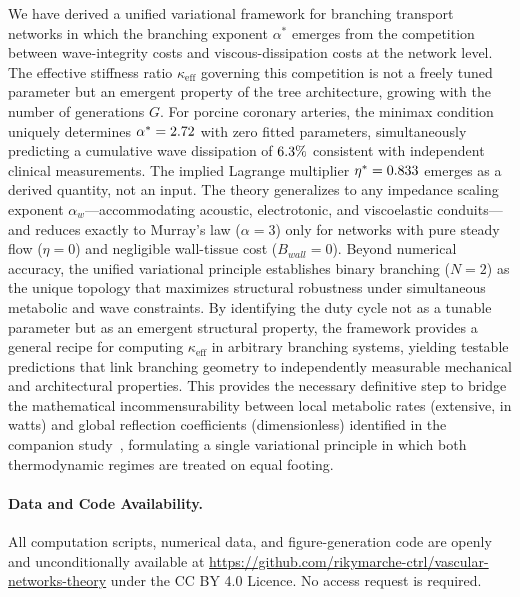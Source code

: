 \documentclass[11pt,a4paper]{article}
\theoremstyle{remark}
\begin{document}
We have derived a unified variational framework for branching transport networks
in which the branching exponent $\alpha^*$ emerges from the competition between
wave-integrity costs and viscous-dissipation costs at the network level.
The effective stiffness ratio $\kappa_\mathrm{eff}$ governing this competition
is not a freely tuned parameter but an emergent property of the tree
architecture, growing with the number of generations $G$.
For porcine coronary arteries, the minimax condition uniquely determines
$\alpha^* = 2.72$ with zero fitted parameters, simultaneously
predicting a cumulative wave dissipation of $6.3\%$ consistent with
independent clinical measurements. The implied Lagrange multiplier $\eta^* =
0.833$ emerges as a derived quantity, not an input.
The theory generalizes to any impedance scaling exponent
$\alpha_w$---accommodating acoustic, electrotonic, and viscoelastic
conduits---and reduces exactly to Murray's law ($\alpha = 3$) only for networks
with pure steady flow ($\eta=0$) and negligible wall-tissue cost ($B_{wall}=0$).
Beyond numerical accuracy, the unified variational principle establishes binary
branching ($N=2$) as the unique topology that maximizes structural robustness
under simultaneous metabolic and wave constraints. By identifying the duty cycle
not as a tunable parameter but as an emergent structural property, the framework
provides a general recipe for computing $\kappa_\mathrm{eff}$ in arbitrary
branching systems, yielding testable predictions that link branching geometry to
independently measurable mechanical and architectural properties. This provides
the necessary definitive step to bridge the mathematical incommensurability
between local metabolic rates (extensive, in watts) and global reflection
coefficients (dimensionless) identified in the companion
study~\cite{Marchesi2026static}, formulating a single variational principle in
which both thermodynamic regimes are treated on equal footing.


\paragraph*{Data and Code Availability.}
All computation scripts, numerical data, and figure-generation code are openly
and unconditionally available at
\url{https://github.com/rikymarche-ctrl/vascular-networks-theory} under the CC
BY 4.0 Licence. No access request is required.



\end{document}
